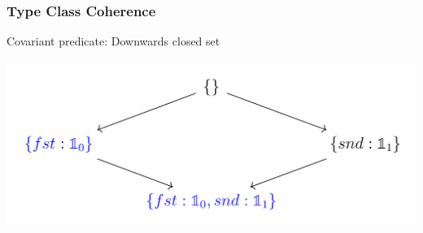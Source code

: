 \documentclass{beamer}
\newcommand\Singleton[1]{\mathbb{1}_#1}
\begin{document}
\begin{frame}
  \frametitle{Type Class Coherence}

  Covariant predicate: Downwards closed set



  \includegraphics[width=\textwidth]{images/lower_set.png}


\end{frame}
\end{document}
